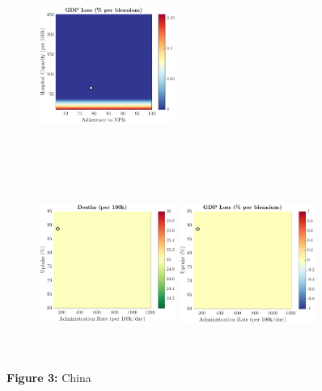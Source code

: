 \documentclass[paper=a4, fontsize=11pt]{scrartcl}
\numberwithin{figure}{section}
\numberwithin{table}{section}
\begin{document}
\begin{figure}[H]
\begin{subfigure}[b]{\textwidth}
	\hspace{0.05cm}
    	\includegraphics[width=0.49\textwidth,height=6cm]{CN/SWINE/npl_g}
    \end{subfigure}
    \begin{subfigure}[b]{\textwidth}
      	\includegraphics[width=0.49\textwidth,height=6cm]{CN/SWINE/imm_d}
	\hspace{0.05cm}
    	\includegraphics[width=0.49\textwidth,height=6cm]{CN/SWINE/imm_g}
    \end{subfigure}
\caption*{\textbf{Figure 3:} China} 
\end{figure}
\end{document}
